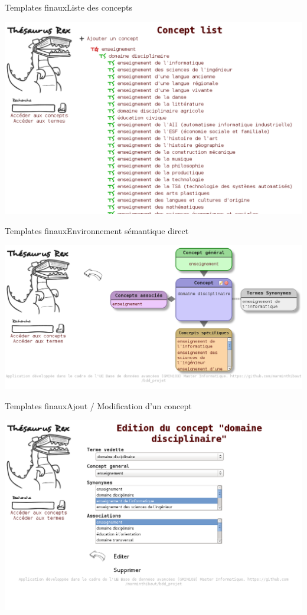 \begin{frame}{Templates finaux}{Liste des concepts}
\begin{center}
\includegraphics[width=\textwidth]{files/screen_concepts}
\end{center}
\end{frame}

\begin{frame}{Templates finaux}{Environnement sémantique direct}
\begin{center}
\includegraphics[width=\textwidth]{files/screen_concept}
\end{center}
\end{frame}

\begin{frame}{Templates finaux}{Ajout / Modification d'un concept}
\begin{center}
\includegraphics[width=\textwidth]{files/screen_concept_edit}
\end{center}
\end{frame}

